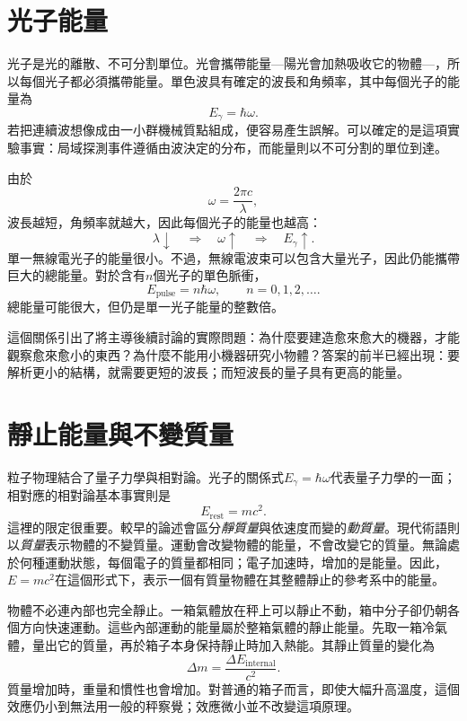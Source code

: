 \section{光子能量}

光子是光的離散、不可分割單位。光會攜帶能量---陽光會加熱吸收它的物體---，所以每個光子都必須攜帶能量。單色波具有確定的波長和角頻率，其中每個光子的能量為
\begin{equation}
E_\gamma=\hbar\omega.
\end{equation}
若把連續波想像成由一小群機械質點組成，便容易產生誤解。可以確定的是這項實驗事實：局域探測事件遵循由波決定的分布，而能量則以不可分割的單位到達。

由於
\begin{equation}
\omega=\frac{2\pi c}{\lambda},
\end{equation}
波長越短，角頻率就越大，因此每個光子的能量也越高：
\begin{equation}
\lambda\downarrow
\quad\Longrightarrow\quad
\omega\uparrow
\quad\Longrightarrow\quad
E_\gamma\uparrow.
\end{equation}
單一無線電光子的能量很小。不過，無線電波束可以包含大量光子，因此仍能攜帶巨大的總能量。對於含有\(n\)個光子的單色脈衝，
\begin{equation}
E_{\text{pulse}}=n\hbar\omega,
\qquad
n=0,1,2,\ldots.
\end{equation}
總能量可能很大，但仍是單一光子能量的整數倍。

這個關係引出了將主導後續討論的實際問題：為什麼要建造愈來愈大的機器，才能觀察愈來愈小的東西？為什麼不能用小機器研究小物體？答案的前半已經出現：要解析更小的結構，就需要更短的波長；而短波長的量子具有更高的能量。

\section{靜止能量與不變質量}

粒子物理結合了量子力學與相對論。光子的關係式\(E_\gamma=\hbar\omega\)代表量子力學的一面；相對應的相對論基本事實則是
\begin{equation}
E_{\mathrm{rest}}=mc^2.
\end{equation}
這裡的限定很重要。較早的論述會區分\emph{靜質量}與依速度而變的\emph{動質量}。現代術語則以\emph{質量}表示物體的不變質量。運動會改變物體的能量，不會改變它的質量。無論處於何種運動狀態，每個電子的質量都相同；電子加速時，增加的是能量。因此，\(E=mc^2\)在這個形式下，表示一個有質量物體在其整體靜止的參考系中的能量。

物體不必連內部也完全靜止。一箱氣體放在秤上可以靜止不動，箱中分子卻仍朝各個方向快速運動。這些內部運動的能量屬於整箱氣體的靜止能量。先取一箱冷氣體，量出它的質量，再於箱子本身保持靜止時加入熱能。其靜止質量的變化為
\begin{equation}
\Delta m=\frac{\Delta E_{\mathrm{internal}}}{c^2}.
\end{equation}
質量增加時，重量和慣性也會增加。對普通的箱子而言，即使大幅升高溫度，這個效應仍小到無法用一般的秤察覺；效應微小並不改變這項原理。

